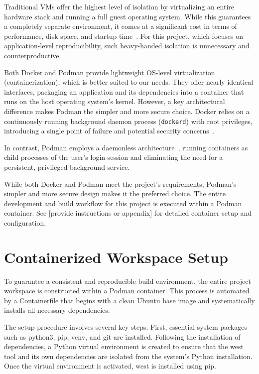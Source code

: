 Traditional VMs offer the highest level of isolation by virtualizing an entire hardware stack and running a full guest operating system. While this guarantees a completely separate environment, it comes at a significant cost in terms of performance, disk space, and startup time~\cite{ibm_containers_vs_vms}. For this project, which focuses on application-level reproducibility, such heavy-handed isolation is unnecessary and counterproductive.

Both Docker and Podman provide lightweight OS-level virtualization (containerization), which is better suited to our needs. They offer nearly identical interfaces, packaging an application and its dependencies into a container that runs on the host operating system's kernel. However, a key architectural difference makes Podman the simpler and more secure choice. Docker relies on a continuously running background daemon process (\texttt{dockerd}) with root privileges, introducing a single point of failure and potential security concerns~\cite{docker_overview, podman_overview}.

In contrast, Podman employs a daemonless architecture~\cite{podman_overview}, running containers as child processes of the user's login session and eliminating the need for a persistent, privileged background service.

While both Docker and Podman meet the project’s requirements, Podman’s simpler and more secure design makes it the preferred choice. The entire development and build workflow for this project is executed within a Podman container. See [provide instructions or appendix] for detailed container setup and configuration.

\section{Containerized Workspace Setup}

To guarantee a consistent and reproducible build environment, the entire project workspace is constructed within a Podman container. This process is automated by a Containerfile that begins with a clean Ubuntu base image and systematically installs all necessary dependencies.

The setup procedure involves several key steps. First, essential system packages such as python3, pip, venv, and git are installed. Following the installation of dependencies, a Python virtual environment is created to ensure that the west tool and its own dependencies are isolated from the system's Python installation. Once the virtual environment is activated, west is installed using pip.

